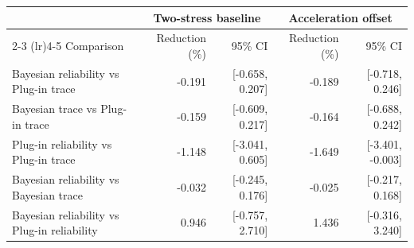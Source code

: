 \begin{tabular}{lrrrr}
\toprule
 & \multicolumn{2}{c}{Two-stress baseline} & \multicolumn{2}{c}{Acceleration offset} \\
\cmidrule(lr){2-3} \cmidrule(lr){4-5}
Comparison & Reduction (\%) & 95\% CI & Reduction (\%) & 95\% CI \\
\midrule
Bayesian reliability vs Plug-in trace & -0.191 & [-0.658, 0.207] & -0.189 & [-0.718, 0.246] \\
Bayesian trace vs Plug-in trace & -0.159 & [-0.609, 0.217] & -0.164 & [-0.688, 0.242] \\
Plug-in reliability vs Plug-in trace & -1.148 & [-3.041, 0.605] & -1.649 & [-3.401, -0.003] \\
Bayesian reliability vs Bayesian trace & -0.032 & [-0.245, 0.176] & -0.025 & [-0.217, 0.168] \\
Bayesian reliability vs Plug-in reliability & 0.946 & [-0.757, 2.710] & 1.436 & [-0.316, 3.240] \\
\bottomrule
\end{tabular}

